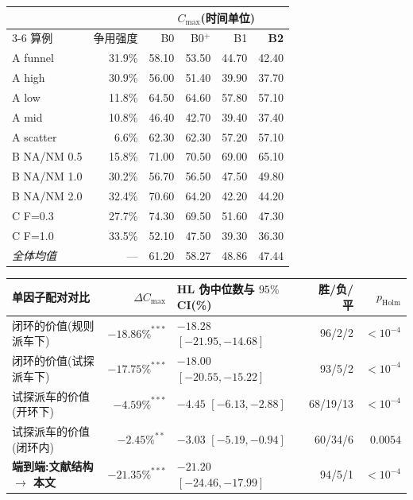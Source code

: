 \begin{tabular}{@{}lrrrrr@{}}
\toprule
& & \multicolumn{4}{c}{$C_{\max}$(时间单位)} \\
\cmidrule(lr){3-6}
算例 & 争用强度 & B0 & B0$^{+}$ & B1 & \textbf{B2} \\
\midrule
A funnel & 31.9\% & 58.10 & 53.50 & 44.70 & 42.40 \\
A high & 30.9\% & 56.00 & 51.40 & 39.90 & 37.70 \\
A low & 11.8\% & 64.50 & 64.60 & 57.80 & 57.10 \\
A mid & 10.8\% & 46.40 & 42.70 & 39.40 & 37.40 \\
A scatter & 6.6\% & 62.30 & 62.30 & 57.20 & 57.10 \\
\midrule
B NA/NM 0.5 & 15.8\% & 71.00 & 70.50 & 69.00 & 65.10 \\
B NA/NM 1.0 & 30.2\% & 56.70 & 56.50 & 47.50 & 49.80 \\
B NA/NM 2.0 & 32.4\% & 70.60 & 64.20 & 42.20 & 44.20 \\
\midrule
C F=0.3 & 27.7\% & 74.30 & 69.50 & 51.60 & 47.30 \\
C F=1.0 & 33.5\% & 52.10 & 47.50 & 39.30 & 36.30 \\
\midrule
\emph{全体均值} & --- & 61.20 & 58.27 & 48.86 & 47.44 \\
\bottomrule
\end{tabular}

\vspace{0.6em}

\begin{tabular}{@{}lrlrr@{}}
\toprule
单因子配对对比 & $\Delta C_{\max}$ & HL 伪中位数与 $95\%$ CI(\%) & 胜/负/平 & $p_{\mathrm{Holm}}$ \\
\midrule
闭环的价值(规则派车下) & $-18.86\%^{***}$ & $-18.28$ $[-21.95,-14.68]$ & 96/2/2 & $<10^{-4}$ \\
闭环的价值(试探派车下) & $-17.75\%^{***}$ & $-18.00$ $[-20.55,-15.22]$ & 93/5/2 & $<10^{-4}$ \\
试探派车的价值(开环下) & $-4.59\%^{***}$ & $-4.45$ $[-6.13,-2.88]$ & 68/19/13 & $<10^{-4}$ \\
试探派车的价值(闭环内) & $-2.45\%^{**}$ & $-3.03$ $[-5.19,-0.94]$ & 60/34/6 & $0.0054$ \\
\midrule
\textbf{端到端:文献结构 $\rightarrow$ 本文} & $-21.35\%^{***}$ & $-21.20$ $[-24.46,-17.99]$ & 94/5/1 & $<10^{-4}$ \\
\bottomrule
\end{tabular}
